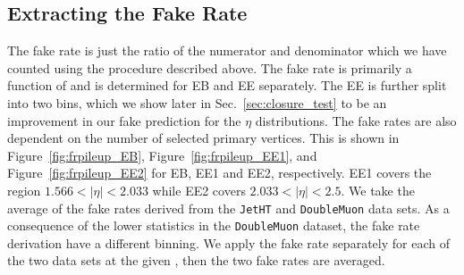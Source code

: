 \subsection{Extracting the Fake Rate}

The fake rate is just the ratio of the numerator and denominator which we have counted using the procedure described above. The fake rate is primarily a function of \pt and is determined for EB and EE separately. The EE is further split into two bins, which we show later in Sec.~\ref{sec:closure_test} to be an improvement in our fake prediction for the $\eta$ distributions. The fake rates are also dependent on the number of selected primary vertices. This is shown in Figure~\ref{fig:frpileup_EB}, Figure~\ref{fig:frpileup_EE1}, and Figure~\ref{fig:frpileup_EE2} for EB, EE1 and EE2, respectively. EE1 covers the region $1.566 < |\eta| < 2.033$ while EE2 covers $2.033 < \lvert \eta \rvert< 2.5$. We take the average of the fake rates derived from the \texttt{JetHT} and \texttt{DoubleMuon} data sets. As a consequence of the lower statistics in the \texttt{DoubleMuon} dataset, the fake rate derivation have a different \pt binning. We apply the fake rate separately for each of the two data sets at the given \pt, then the two fake rates are averaged.

